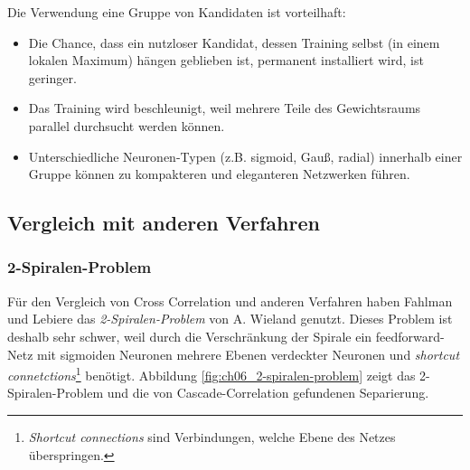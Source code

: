 Die Verwendung eine Gruppe von Kandidaten ist vorteilhaft:
\begin{itemize}
	\item Die Chance, dass ein nutzloser Kandidat, dessen Training selbst (in einem lokalen Maximum) hängen geblieben ist, permanent installiert wird, ist geringer.
	\item Das Training wird beschleunigt, weil mehrere Teile des Gewichtsraums parallel durchsucht werden können.
	\item Unterschiedliche Neuronen-Typen (z.B. sigmoid, Gauß, radial) innerhalb einer Gruppe können zu kompakteren und eleganteren Netzwerken führen.
\end{itemize}


\subsection*{Vergleich mit anderen Verfahren}
\subsubsection*{2-Spiralen-Problem}
Für den Vergleich von Cross Correlation und anderen Verfahren haben Fahlman und Lebiere das \emph{2-Spiralen-Problem} von A. Wieland genutzt.
Dieses Problem ist deshalb sehr schwer, weil durch die Verschränkung der Spirale ein feedforward-Netz mit sigmoiden Neuronen mehrere Ebenen verdeckter Neuronen und \emph{shortcut connetctions}\footnote{\emph{Shortcut connections} sind Verbindungen, welche Ebene des Netzes überspringen.} benötigt.
Abbildung \ref{fig:ch06_2-spiralen-problem} zeigt das 2-Spiralen-Problem und die von Cascade-Correlation gefundenen Separierung.

